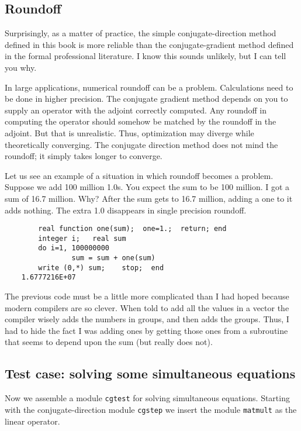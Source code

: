 \subsection{Roundoff}

Surprisingly, as a matter of practice, the simple conjugate-direction method
defined in this book is more reliable than the conjugate-gradient method
defined in the formal professional literature.
I know this sounds unlikely, but I can tell you why.
\par
In large applications, 
numerical roundoff can be a problem. 
Calculations need to be done in higher precision.
The conjugate gradient method depends on you to supply an operator
with the adjoint correctly computed.
Any roundoff in computing the operator should somehow be matched
by the roundoff in the adjoint.   But that is unrealistic.
Thus, optimization may diverge while theoretically converging.
The conjugate direction method does not mind the roundoff;
it simply takes longer to converge.
\par
Let us see an example of a situation in which roundoff becomes a problem.
Suppose we add 100 million 1.0s.  You expect the sum to be 100 million.
I got a sum of 16.7 million.
Why?
After the sum gets to 16.7 million, adding a one to it adds nothing.
The extra 1.0 disappears in single precision roundoff.
\par
\begin{verbatim}
        real function one(sum);  one=1.;  return; end
        integer i;   real sum
        do i=1, 100000000
                sum = sum + one(sum)
        write (0,*) sum;    stop;  end
	1.6777216E+07
\end{verbatim}
\par
The previous code must be a little more complicated than I had hoped
because modern compilers are so clever.
When told to add all the values in a vector the compiler wisely
adds the numbers in groups, and then adds the groups.
Thus, I had to hide the fact I was adding ones by getting those ones
from a subroutine that seems to depend upon the sum (but really
does not).

\subsection{Test case: solving some simultaneous equations}
\par
Now we assemble a module \texttt{cgtest} for solving simultaneous equations.
Starting with the conjugate-direction module {\tt cgstep} 
we insert the module \texttt{matmult}  as the linear operator.

